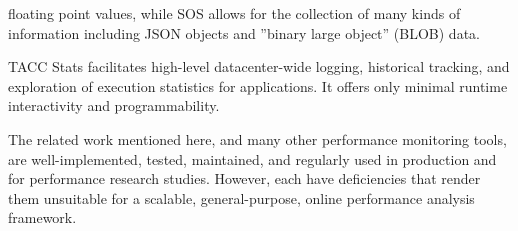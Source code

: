 floating point values, while SOS allows for the collection of many
kinds of information including JSON objects and ''binary large
object'' (BLOB) data.
%
\par
%
TACC Stats \cite{evans2014comprehensive} facilitates high-level
datacenter-wide logging, historical tracking, and exploration of
execution statistics for applications.  It offers only minimal
runtime interactivity and programmability.
%
\par
%
The related work mentioned here, and many other performance monitoring
tools, are well-implemented, tested, maintained, and regularly used
in production and for performance research studies.
%
However, each have deficiencies that render them unsuitable for a
scalable, general-purpose, online performance analysis framework.
%


